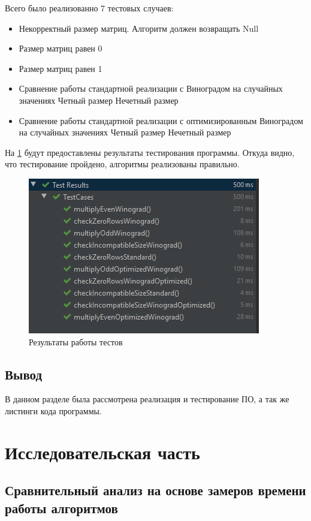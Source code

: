 \documentclass[12pt]{report}
\begin{document}
Всего было реализованно 7 тестовых случаев:
\begin{itemize}
	\item Некорректный размер матриц. Алгоритм должен возвращать Null
	\item Размер матриц равен 0
	\item Размер матриц равен 1
	\item Сравнение работы стандартной реализации с Виноградом на случайных значениях
	\subitem Четный размер
	\subitem Нечетный размер
	\item Сравнение работы стандартной реализации с оптимизированным Виноградом на случайных значениях
	\subitem Четный размер
	\subitem Нечетный размер
\end{itemize}

На \ref{fig:test} будут предоставлены результаты тестирования программы. Откуда видно, что тестирование пройдено, алгоритмы реализованы правильно.
\begin{figure}[!htbp]
\centering
\includegraphics[scale=1.2]{TestsPassed}
\caption{Результаты работы тестов}
\label{fig:test}
\end{figure} 

\newpage
\section{Вывод}
В данном разделе была рассмотрена реализация и тестирование ПО, а так же листинги кода программы.


\chapter{Исследовательская часть}

\section{Сравнительный анализ на основе замеров времени работы алгоритмов}
\end{document}
